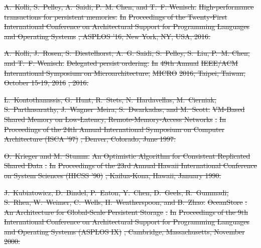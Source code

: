 \documentclass[sigconf]{acmart}
\renewcommand{\em}{\it}
\providecommand{\DIFdel}[1]{{\protect\color{red}\sout{#1}}}                      %
\begin{document}
{%
\DIFdel{A.~Kolli, S.~Pelley, A.~Saidi, P.~M. Chen, and T.~F. Wenisch.
}%
\DIFdel{High-performance transactions for persistent memories.
}%
\DIFdel{In }%
\DIFdel{Proceedings of the Twenty-First International Conference on
  Architectural Support for Programming Languages and Operating Systems}%
\DIFdel{,
  ASPLOS '16, New York, NY, USA, 2016.
}%

\DIFdel{A.~Kolli, J.~Rosen, S.~Diestelhorst, A.~G. Saidi, S.~Pelley, S.~Liu, P.~M.
  Chen, and T.~F. Wenisch.
}%
\DIFdel{Delegated persist ordering.
}%
\DIFdel{In }%
\DIFdel{49th Annual }%
\DIFdel{IEEE/ACM}%
\DIFdel{International Symposium on
  Microarchitecture, }%
\DIFdel{MICRO}%
\DIFdel{2016, Taipei, Taiwan, October 15-19, 2016}%
\DIFdel{, 2016.
}%

\DIFdel{L.~Kontothanassis, G.~Hunt, R.~Stets, N.~Hardavellas, M.~Cierniak,
  S.~Parthasarathy, J.~Wagner~Meira, S.~Dwarkadas, and M.~Scott.
}%
\DIFdel{VM-Based Shared Memory on Low-Latency, Remote-Memory-Access
  Networks}%
\DIFdel{.
}%
\DIFdel{In }%
\DIFdel{Proceedings of the 24th Annual International Symposium on
  Computer Architecture (ISCA ’97)}%
\DIFdel{, Denver, Colorado, June 1997.
}%

\DIFdel{O.~Krieger and M.~Stumm.
}%
\DIFdel{An Optimistic Algorithm for Consistent Replicated Shared Data}%
\DIFdel{.
}%
\DIFdel{In }%
\DIFdel{Proceedings of the 23rd Annual Hawaii International
  Conference on System Sciences (HICSS ’90)}%
\DIFdel{, Kailua-Kona, Hawaii, January
  1990.
}%

\DIFdel{J.~Kubiatowicz, D.~Bindel, P.~Eaton, Y.~Chen, D.~Geels, R.~Gummadi, S.~Rhea,
  W.~Weimer, C.~Wells, H.~Weatherspoon, and B.~Zhao.
}%
\DIFdel{OceanStore}%
\DIFdel{: An Architecture for Global-Scale Persistent Storage}%
\DIFdel{.
}%
\DIFdel{In }%
\DIFdel{Proceedings of the 9th International Conference on
  Architectural Support for Programming Languages and Operating Systems (ASPLOS
  IX)}%
\DIFdel{, Cambridge, Massachusetts, November 2000.
}%

}
\end{document}
